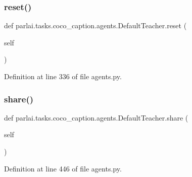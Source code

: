\subsubsection{\texorpdfstring{reset()}{reset()}}
{\footnotesize\ttfamily def parlai.\+tasks.\+coco\+\_\+caption.\+agents.\+Default\+Teacher.\+reset (\begin{DoxyParamCaption}\item[{}]{self }\end{DoxyParamCaption})}



Definition at line 336 of file agents.\+py.

\mbox{\label{classparlai_1_1tasks_1_1coco__caption_1_1agents_1_1DefaultTeacher_a9b7c2be6b8702f1aec7087a568b3439c}} 
\subsubsection{\texorpdfstring{share()}{share()}}
{\footnotesize\ttfamily def parlai.\+tasks.\+coco\+\_\+caption.\+agents.\+Default\+Teacher.\+share (\begin{DoxyParamCaption}\item[{}]{self }\end{DoxyParamCaption})}



Definition at line 446 of file agents.\+py.



